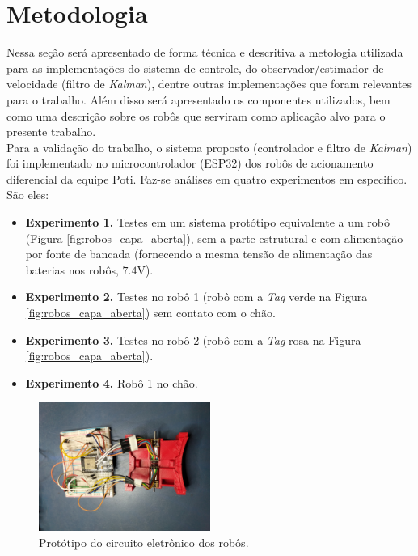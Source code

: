 \chapter[Metodologia]{Metodologia}
\label{ch:metodologia}

Nessa seção será apresentado de forma técnica e descritiva a metologia utilizada para as implementações do sistema de controle, do observador/estimador de velocidade (filtro de \emph{Kalman}), dentre outras implementações que foram relevantes para o trabalho. Além disso será apresentado os componentes utilizados, bem como uma descrição sobre os robôs que serviram como aplicação alvo para o presente trabalho.\\

Para a validação do trabalho, o sistema proposto (controlador e filtro de \emph{Kalman}) foi implementado no microcontrolador (ESP32) dos robôs de acionamento diferencial da equipe Poti. Faz-se análises em quatro experimentos em especifico. São eles:

\begin{itemize}
    \item \textbf{Experimento 1.} Testes em um sistema protótipo equivalente a um robô (Figura \ref{fig:robos_capa_aberta}), sem a parte estrutural e com alimentação por fonte de bancada (fornecendo a mesma tensão de alimentação das baterias nos robôs, $7.4$V).
    \item \textbf{Experimento 2.} Testes no robô 1 (robô com a \emph{Tag} verde na Figura \ref{fig:robos_capa_aberta}) sem contato com o chão.
    \item \textbf{Experimento 3.} Testes no robô 2 (robô com a \emph{Tag} rosa na Figura \ref{fig:robos_capa_aberta}).
    \item \textbf{Experimento 4.} Robô 1 no chão.
\end{itemize}

\begin{figure}[H]
    \centering
    \includegraphics[width=0.5\textwidth]{figuras/robo/protoboard.jpg}
    \caption{Protótipo do circuito eletrônico dos robôs.}
    \label{fig:prototipo}
\end{figure}

